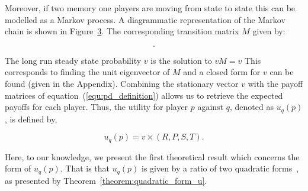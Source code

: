 \documentclass[10pt]{article}
\begin{document}
\begin{figure}
    \centering
    \begin{subfigure}{0.45\textwidth}
        \centering
        
        \label{fig:diagram_mem_one}
    \end{subfigure}
    \begin{subfigure}{0.45\textwidth}
        \centering
        
        \label{fig:markov_chain}
    \end{subfigure}
\end{figure}

Moreover, if two memory one players are moving from state to state
this can be modelled as a Markov process. A diagrammatic
representation of the Markov chain is shown in Figure~\ref{fig:markov_chain}.
The corresponding transition matrix \(M\) given by:

\begin{equation}\label{eq:m_matrix}
    .
\end{equation}

The long run steady state probability \(v\) is the solution to
\(v M = v\)
This corresponds to finding the unit eigenvector of \(M\) and a closed form
for \(v\) can be found (given in the Appendix). %
Combining the stationary vector \(v\) with the payoff matrices of
equation~(\ref{equ:pd_definition})
allows us to retrieve the expected payoffs for each player. Thus, the utility for
player \(p\) against \(q\), denoted as \(u_q(p)\), is defined by,

\begin{equation}\label{eq:press_dyson_utility}
    u_q(p) = v \times (R, P, S, T).
\end{equation}

Here, to our knowledge, we present the first theoretical result which
concerns the form of \(u_q(p)\). That is that \(u_q(p)\) is given by a ratio of
two quadratic forms~\cite{kepner2011}, as presented by
Theorem~\ref{theorem:quadratic_form_u}.
\end{document}
